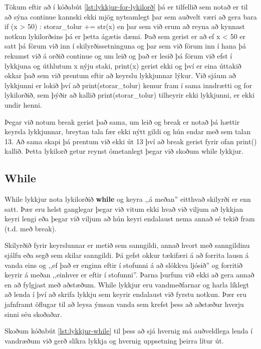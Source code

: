 Tökum eftir að í kóðabút \ref{lst:lykkjur-for-lykilorð} þá er tilfellið sem notað er til að sýna continue kannski ekki mjög nytsamlegt þar sem auðvelt væri að gera bara if (x > 50) : storar\_tolur += str(x) en þar sem við erum að reyna að kynnast notkun lykilorðsins þá er þetta ágætis dæmi.
Það sem gerist er að ef x < 50 er satt þá förum við inn í skilyrðissetninguna og þar sem við förum inn í hana þá rekumst við á orðið continue og um leið og það er lesið þá förum við efst í lykkjuna og úthlutum x nýju staki, print(x) gerist ekki og því er eina úttakið okkar það sem við prentum eftir að keyrslu lykkjunnar lýkur.
Við sjáum að lykkjunni er lokið því að print(storar\_tolur) kemur fram í sama inndrætti og for lykilorðið, sem þýðir að kallið print(storar\_tolur) tilheyrir ekki lykkjunni, er ekki undir henni.

Þegar við notum break gerist það sama, um leið og break er notað þá hættir keyrsla lykkjunnar, breytan tala fær ekki nýtt gildi og hún endar með sem talan 13.
Að sama skapi þá prentum við ekki út 13 því að break gerist fyrir ofan print() kallið.
Þetta lykilorð getur reynst ómetanlegt þegar við skoðum while lykkjur.

\subsection{While}
While lykkjur nota lykilorðið \textbf{while} og keyra ,,á meðan'' eitthvað skilyrði er enn satt.
Þær eru helst ganglegar þegar við vitum ekki hvað við viljum að lykkjan keyri lengi eða þegar við viljum að hún keyri endalaust nema annað sé tekið fram (t.d. með break).

Skilyrðið fyrir keyrslunnar er metið sem sanngildi, annað hvort með sanngildinu sjálfu eða segð sem skilar sanngildi.
Þá gefst okkur tækifæri á að forrita lausn á vanda eins og ,,ef það er enginn eftir í stofunni á að slökkva ljósið'' og forritið keyrir á meðan ,,einhver er eftir í stofunni''.
Þarna þurfum við ekki að gera annað en að fylgjast með aðstæðum.
While lykkjur eru vandmeðfarnar og harla líklegt að lenda í því að skrifa lykkju sem keyrir endalaust við fyrstu notkun.
Þær eru jafnframt öflugar til að leysa ýmsan vanda sem krefst þess að aðstæður hverju sinni séu skoðaðar.

Skoðum kóðabút \ref{lst:lykkjur-while} til þess að sjá hvernig má auðveldlega lenda í vandræðum við gerð slíkra lykkja og hvernig uppsetning þeirra lítur út.


